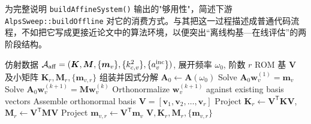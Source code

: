 \documentclass[UTF8,a4paper,11pt]{ctexart}
\newcommand{\transpose}{\mathsf{T}}
\newcommand{\code}[1]{\texttt{\small #1}}
\begin{document}
为完整说明 \code{buildAffineSystem()} 输出的"够用性"，简述下游 \code{AlpsSweep::buildOffline}
对它的消费方式。与其把这一过程描述成普通代码流程，不如把它写成更接近论文中的算法环境，以便突出“离线构基—在线评估”的两阶段结构。

\begin{algorithm}[h]
\caption{由仿射系统构造 \code{AlpsSweep} 的 ROM}
\label{alg:alps-rom}
\begin{algorithmic}[1]
\Require 仿射数据 $\mathcal{A}_{\mathrm{aff}}=(\bm K,\bm M,\{\bm m_v\},\{k_{c,v}^2\},\{a_v^{\rm inc}\})$, 展开频率 $\omega_0$, 阶数 $r$
\Ensure ROM 基 $\bm V$ 及小矩阵 $\bm K_r,\bm M_r,\{\bm m_{v,r}\}$
\State 组装并因式分解 $\bm A_0 \gets \bm A(\omega_0)$
    \State Solve $\bm A_0\bm w_v^{(1)}=\bm m_v$ 
        \State Solve $\bm A_0\bm w_v^{(k+1)}=\bm M\bm w_v^{(k)}$
        \State Orthonormalize $\bm w_v^{(k+1)}$ against existing basis vectors
    \EndFor
\EndFor
\State Assemble orthonormal basis $\bm V=[\bm v_1,\bm v_2,\dots,\bm v_r]$
\State Project $\bm K_r\gets\bm V^{\transpose}\bm K\bm V$, $\bm M_r\gets\bm V^{\transpose}\bm M\bm V$
    \State Project $\bm m_{v,r}\gets\bm V^{\transpose}\bm m_v$
\EndFor
\State \Return $\bm V,\bm K_r,\bm M_r,\{\bm m_{v,r}\}$
\end{algorithmic}
\end{algorithm}
\end{document}

